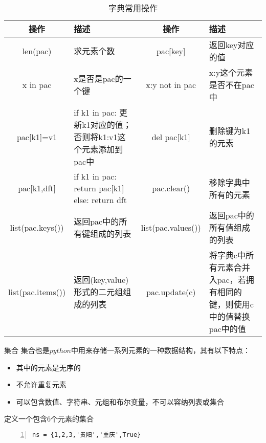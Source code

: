 \documentclass{beamer}
\begin{document}
\begin{frame}
\tiny{
\begin{table}[htp]
\caption{字典常用操作}
\begin{center}
\begin{tabular}{cp{11em}cp{11em}}
\toprule
\textbf{操作}&\textbf{描述}&\textbf{操作}&\textbf{描述}\\
\midrule
len(pac)&求元素个数&pac[key]&返回key对应的值\\
x in pac&x是否是pac的一个键&x:y not in pac&x:y这个元素是否不在pac中\\
pac[k1]=v1&if k1 in pac: 更新k1对应的值；否则将k1:v1这个元素添加到pac中&del pac[k1]&删除键为k1的元素\\
pac[k1,dft]&if k1 in pac: return pac[k1] else: return dft&pac.clear()&移除字典中所有的元素\\
list(pac.keys())&返回pac中的所有键组成的列表&list(pac.values())&返回pac中的所有值组成的列表\\
list(pac.items())&返回(key,value)形式的二元组组成的列表&pac.update(c)&将字典c中所有元素合并入pac，若拥有相同的键，则使用c中的值替换pac中的值\\
\bottomrule
\end{tabular}
\end{center}
\label{dict}
\end{table}%
}
\end{frame}
\begin{frame}[fragile]{集合}
集合也是$python$中用来存储一系列元素的一种数据结构，其有以下特点：
\begin{itemize}
\item 其中的元素是无序的
\item 不允许重复元素
\item 可以包含数值、字符串、元组和布尔变量，不可以容纳列表或集合
\end{itemize}
\begin{block}{定义一个包含6个元素的集合}
\begin{Verbatim}[numbers=left,frame=single,rulecolor=\color{red}]
ns = {1,2,3,'贵阳','重庆',True}
\end{Verbatim}
\end{block}
\end{frame}
\end{document}
